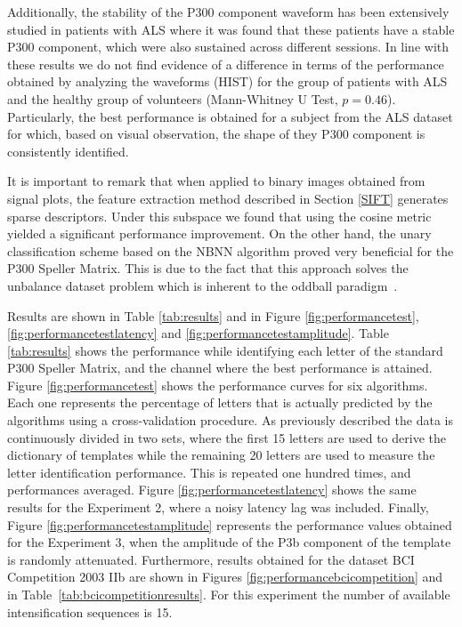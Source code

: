 Additionally, the stability of the P300 component waveform has been extensively studied in patients with ALS \cite{SellersandEmanuelDonchin2006,TomohiroMadarame2008,Nijboer2009,Mak2012,McCane2015} where it was found that these patients have a stable P300 component, which were also sustained across different sessions.  In line with these results we do not find evidence of a difference in terms of the performance obtained by analyzing the waveforms (HIST) for the group of patients with ALS and the healthy group of volunteers (Mann-Whitney U Test, $p=0.46$). Particularly, the best performance is obtained for a subject from the ALS dataset for which, based on visual observation, the shape of they P300 component is consistently identified.


It is important to remark that when applied to binary images obtained from signal plots, the feature extraction method described in Section \ref{SIFT} generates sparse descriptors.  Under this subspace we found that using the cosine metric yielded a significant performance improvement. On the other hand, the unary classification scheme based on the NBNN algorithm proved very beneficial for the P300 Speller Matrix.  This is due to the fact that this approach solves the unbalance dataset problem which is inherent to the oddball paradigm~\cite{Tibon2015}.  



Results are shown in Table \ref{tab:results} and in Figure \ref{fig:performancetest},\ref{fig:performancetestlatency} and \ref{fig:performancetestamplitude}.  Table \ref{tab:results} shows the  performance while identifying each letter of the standard P300 Speller Matrix, and the channel where the best performance is attained.   Figure \ref{fig:performancetest} shows the performance curves for six algorithms.  Each one represents the percentage of letters that is actually predicted by the algorithms using a cross-validation procedure.  As previously described the data is continuously divided in two sets, where the first 15 letters are used to derive the dictionary of templates while the remaining 20 letters are used to measure the letter identification performance. This is repeated one hundred times, and performances averaged.   Figure \ref{fig:performancetestlatency} shows the same results for the Experiment 2, where a noisy latency lag was included.   Finally, Figure \ref{fig:performancetestamplitude} represents the performance values obtained for the Experiment 3, when the amplitude of the P3b component of the template is randomly attenuated.  Furthermore, results obtained for the dataset BCI Competition 2003 IIb are shown in Figures \ref{fig:performancebcicompetition} and in Table~\ref{tab:bcicompetitionresults}.  For this experiment the number of available intensification sequences is 15.

